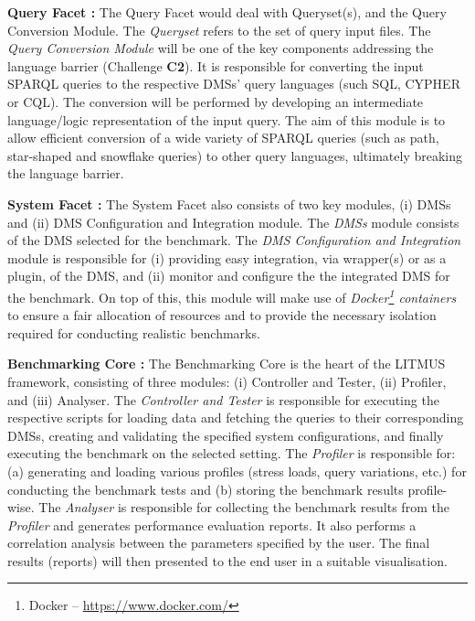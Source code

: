 \documentclass{llncs}
\begin{document}
        \textbf{Query Facet :} The Query Facet would deal with Queryset(s), and the Query Conversion Module. The \textit{Queryset} refers to the set of query input files. The \textit{Query Conversion Module} will be one of the key components addressing the language barrier (Challenge \textbf{C2}). It is responsible for converting the input SPARQL queries to the respective DMSs' query languages (such SQL, CYPHER or CQL).
        The conversion will be performed by developing an intermediate language/logic representation of the input query.
        The aim of this module is to allow efficient conversion of a wide variety of SPARQL queries (such as path, star-shaped and snowflake queries) to other query languages, ultimately breaking the language barrier.
        
        \textbf{System Facet :} The System Facet also consists of two key modules, (i) DMSs and (ii) DMS Configuration and Integration module.
        The \textit{DMSs} module consists of the DMS selected for the benchmark.
        The \textit{DMS Configuration and Integration} module is responsible for (i) providing easy integration, via wrapper(s) or as a plugin, of the DMS, and (ii) monitor and configure the the integrated DMS for the benchmark.
        On top of this, this module will make use of \textit{Docker\footnote{Docker -- \url{https://www.docker.com/}} containers} to ensure a fair allocation of resources and to provide the necessary isolation required for conducting realistic benchmarks. 
        
        \textbf{Benchmarking Core :} The Benchmarking Core is the heart of the LITMUS framework, consisting of three modules: (i) Controller and Tester, (ii) Profiler, and (iii) Analyser.
        The \textit{Controller and Tester} is responsible for executing the respective scripts for loading data and fetching the queries to their corresponding DMSs, creating and validating the specified system configurations, and finally executing the benchmark on the selected setting.
        The \textit{Profiler} is responsible for: (a) generating and loading various profiles (stress loads, query variations, etc.) for conducting the benchmark tests and (b) storing the benchmark results profile-wise. The \textit{Analyser} is responsible for collecting the benchmark results from the \textit{Profiler} and generates performance evaluation reports.
        It also performs a correlation analysis between the parameters specified by the user. The final results (reports) will then presented to the end user in a suitable visualisation.
        
\end{document}
